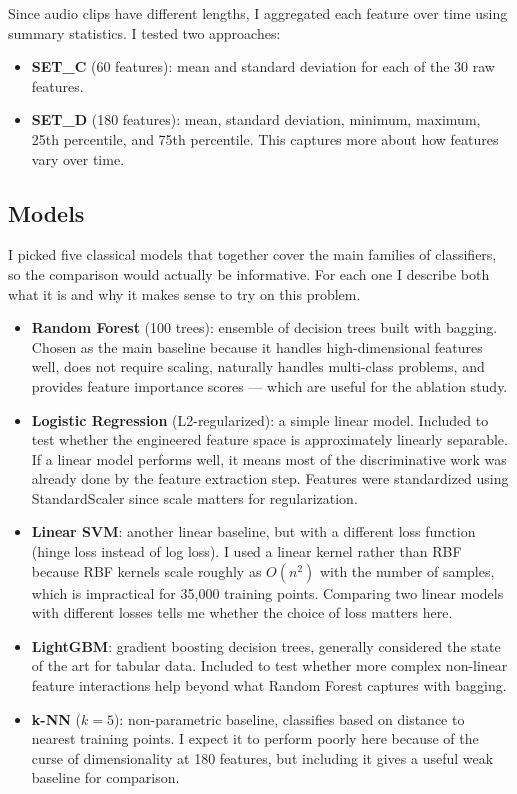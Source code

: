 \documentclass[11pt,a4paper]{article}
\begin{document}
Since audio clips have different lengths, I aggregated each feature over time using summary statistics. I tested two approaches:

\begin{itemize}
    \item \textbf{SET\_C} (60 features): mean and standard deviation for each of the 30 raw features.
    \item \textbf{SET\_D} (180 features): mean, standard deviation, minimum, maximum, 25th percentile, and 75th percentile. This captures more about how features vary over time.
\end{itemize}

\subsection{Models}

I picked five classical models that together cover the main families of classifiers, so the comparison would actually be informative. For each one I describe both what it is and why it makes sense to try on this problem.

\begin{itemize}
    \item \textbf{Random Forest} (100 trees): ensemble of decision trees built with bagging. Chosen as the main baseline because it handles high-dimensional features well, does not require scaling, naturally handles multi-class problems, and provides feature importance scores — which are useful for the ablation study.
    \item \textbf{Logistic Regression} (L2-regularized): a simple linear model. Included to test whether the engineered feature space is approximately linearly separable. If a linear model performs well, it means most of the discriminative work was already done by the feature extraction step. Features were standardized using StandardScaler since scale matters for regularization.
    \item \textbf{Linear SVM}: another linear baseline, but with a different loss function (hinge loss instead of log loss). I used a linear kernel rather than RBF because RBF kernels scale roughly as $O(n^2)$ with the number of samples, which is impractical for 35,000 training points. Comparing two linear models with different losses tells me whether the choice of loss matters here.
    \item \textbf{LightGBM}: gradient boosting decision trees, generally considered the state of the art for tabular data. Included to test whether more complex non-linear feature interactions help beyond what Random Forest captures with bagging.
    \item \textbf{k-NN} ($k=5$): non-parametric baseline, classifies based on distance to nearest training points. I expect it to perform poorly here because of the curse of dimensionality at 180 features, but including it gives a useful weak baseline for comparison.
\end{itemize}
\end{document}
